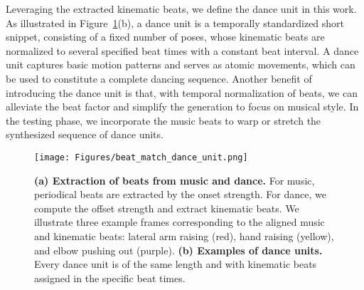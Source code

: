 \documentclass{article}
\newlength\figmargin
\begin{document}
Leveraging the extracted kinematic beats, we define the dance unit in this work.
As illustrated in Figure~\ref{fig:beat_match_dance_unit}(b), a dance unit is a temporally standardized short snippet, consisting of a fixed number of poses, whose kinematic beats are normalized to several specified beat times with a constant beat interval.
A dance unit captures basic motion patterns and serves as atomic movements, which can be used to constitute a complete dancing sequence.
Another benefit of introducing the dance unit is that, with temporal normalization of beats, we can alleviate the beat factor and simplify the generation to focus on musical style. 
In the testing phase, we incorporate the music beats to warp or stretch the synthesized sequence of dance units.

\begin{figure}[t]
    \texttt{[image: Figures/beat\_match\_dance\_unit.png]}
\caption{\textbf{(a) Extraction of beats from music and dance.} For music, periodical beats are extracted by the onset strength. For dance, we compute the offset strength and extract kinematic beats. We illustrate three example frames corresponding to the aligned music and kinematic beats: lateral arm raising (red), hand raising (yellow), and elbow pushing out (purple). \textbf{(b) Examples of dance units.} Every dance unit is of the same length and with kinematic beats assigned in the specific beat times.}
    \label{fig:beat_match_dance_unit}
    \vspace{\figmargin}

\end{figure}
\end{document}
